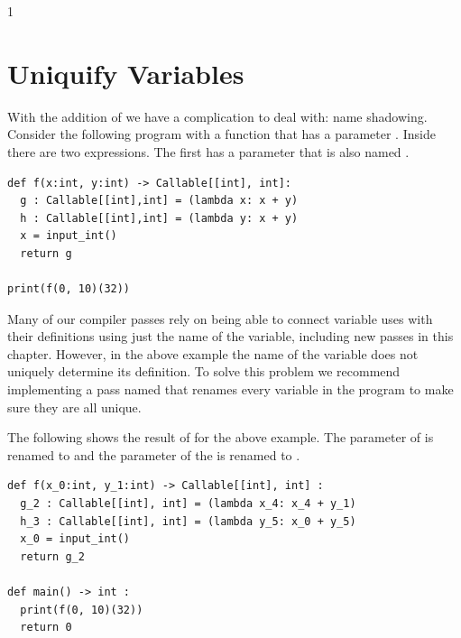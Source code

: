 \documentclass[7x10]{TimesAPriori_MIT}%
\def\racketEd{0}
\def\pythonEd{1}
\def\edition{1}
\newcommand{\racket}[1]{{\if\edition\racketEd{#1}\fi}}
\newcommand{\pythonColor}[0]{}
\newcommand{\python}[1]{{\if\edition\pythonEd\pythonColor #1\fi}}
\numberwithin{theorem}{chapter}
\numberwithin{definition}{chapter}
\numberwithin{equation}{chapter}
\begin{document}
{\if\edition\pythonEd\pythonColor
\section{Uniquify Variables}
\label{sec:uniquify-lambda}

With the addition of  we have a complication to deal
with: name shadowing. Consider the following program with a function
 that has a parameter . Inside  there are two
 expressions. The first  has a parameter
that is also named .

\begin{lstlisting}
def f(x:int, y:int) -> Callable[[int], int]:
  g : Callable[[int],int] = (lambda x: x + y)
  h : Callable[[int],int] = (lambda y: x + y)
  x = input_int()
  return g

print(f(0, 10)(32))
\end{lstlisting}

Many of our compiler passes rely on being able to connect variable
uses with their definitions using just the name of the variable,
including new passes in this chapter. However, in the above example
the name of the variable does not uniquely determine its
definition. To solve this problem we recommend implementing a pass
named  that renames every variable in the program to
make sure they are all unique.

The following shows the result of  for the above
example. The  parameter of  is renamed to 
and the  parameter of the  is renamed to
.

\begin{lstlisting}
def f(x_0:int, y_1:int) -> Callable[[int], int] :
  g_2 : Callable[[int], int] = (lambda x_4: x_4 + y_1)
  h_3 : Callable[[int], int] = (lambda y_5: x_0 + y_5)
  x_0 = input_int()
  return g_2

def main() -> int :
  print(f(0, 10)(32))
  return 0
\end{lstlisting}

\fi} %


\end{document}
